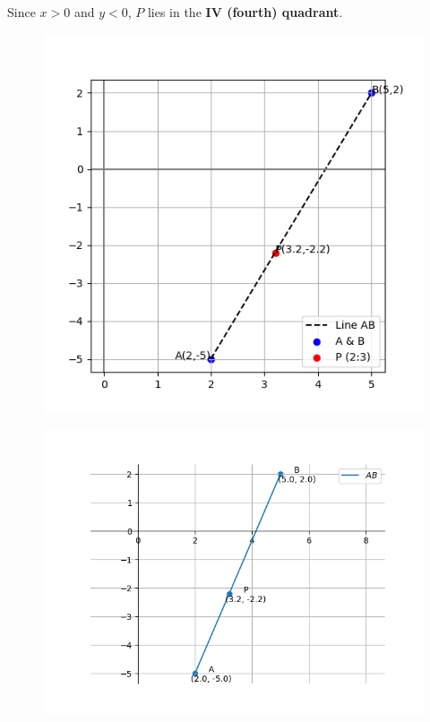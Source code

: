 \documentclass[journal]{article}
\begin{document}
Since \(x>0\) and \(y<0\), \(P\) lies in the \textbf{IV (fourth) quadrant}.
\newpage
\begin{figure}
    \centering
    \includegraphics[width=0.9\linewidth]{figs/fig_1.png}
    \caption{}
    \label{fig:placeholder}
\end{figure}
\begin{figure}
    \centering
    \includegraphics[width=1.0\linewidth]{figs/fig_2.png}
    \caption{}
    \label{fig:placeholder}
\end{figure}
\end{document}
